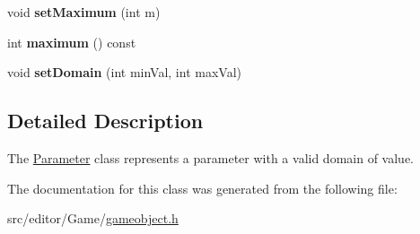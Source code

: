 \begin{DoxyCompactItemize}
\item 
\hypertarget{class_parameter_ac5566dd445d208c138fc3f4510866959}{void {\bfseries set\-Maximum} (int m)}\label{class_parameter_ac5566dd445d208c138fc3f4510866959}

\item 
\hypertarget{class_parameter_afad0d040faf31c5faeaf63cd5cf048c8}{int {\bfseries maximum} () const }\label{class_parameter_afad0d040faf31c5faeaf63cd5cf048c8}

\item 
\hypertarget{class_parameter_a0a239a5f6f32ca67ef601730f5aa2e6d}{void {\bfseries set\-Domain} (int min\-Val, int max\-Val)}\label{class_parameter_a0a239a5f6f32ca67ef601730f5aa2e6d}

\end{DoxyCompactItemize}


\subsection{\-Detailed \-Description}
\-The \hyperlink{class_parameter}{\-Parameter} class represents a parameter with a valid domain of value. 

\-The documentation for this class was generated from the following file\-:\begin{DoxyCompactItemize}
\item 
src/editor/\-Game/\hyperlink{gameobject_8h}{gameobject.\-h}\end{DoxyCompactItemize}
